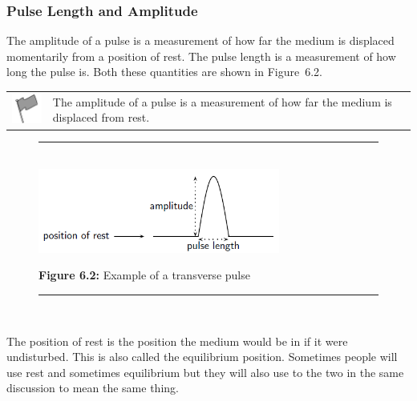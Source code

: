             \subsubsection{ Pulse Length and Amplitude}
            \nopagebreak
        \label{m38801*id312946}The amplitude of a pulse is a measurement of how far the medium is displaced momentarily from a position of rest. The pulse length is a measurement of how long the pulse is. Both these quantities are shown in Figure~6.2.\par 
\label{m38801*fhsst!!!underscore!!!id77}\begin{definition}
	  \begin{tabular*}{15 cm}{m{15 mm}m{}}
	\hspace*{-50pt}  \includegraphics[width=0.5in]{col11305.imgs/psflag2.png}   & \Definition{   \label{id2434920}\textbf{ Amplitude }} { \label{m38801*meaningfhsst!!!underscore!!!id77}
        \label{m38801*id312963}The amplitude of a pulse is a measurement of how far the medium is displaced from rest. \par 
         } 
      \end{tabular*}
      \end{definition}
    \setcounter{subfigure}{0}
	\begin{figure}[H] %
    \begin{center}
    \rule[.1in]{\figurerulewidth}{.005in} \\
        \label{m38801*uid2!!!underscore!!!media}\label{m38801*uid2!!!underscore!!!printimage}\includegraphics[width=300px]{col11305.imgs/m38801_PG10C4_002.png} %
      \vspace{2pt}
    \vspace{\rubberspace}\par \begin{cnxcaption}
	  \small \textbf{Figure 6.2: }Example of a transverse pulse
	\end{cnxcaption}
    \vspace{.1in}
    \rule[.1in]{\figurerulewidth}{.005in} \\
    \end{center}
 \end{figure}       
\label{m38801*eip-400}The position of rest is the position the medium would be in if it were undisturbed. This is also called the equilibrium position. Sometimes people will use rest and sometimes equilibrium but they will also use to the two in the same discussion to mean the same thing.\par \label{m38801*secfhsst!!!underscore!!!id87}
